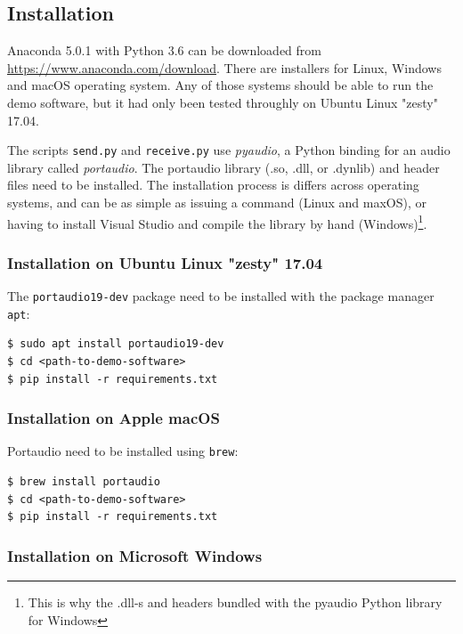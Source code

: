 \documentclass[a4paper]{article}
\begin{document}
\subsection{Installation}

Anaconda 5.0.1 with Python 3.6 can be downloaded from 
\url{https://www.anaconda.com/download}. There are installers for 
Linux, Windows and macOS operating system. Any of those systems should 
be able to run the demo software, but it had only been tested throughly 
on Ubuntu Linux "zesty" 17.04.

The scripts \texttt{send.py} and \texttt{receive.py} use 
\textit{pyaudio}, a Python binding for an audio library called 
\textit{portaudio}. The portaudio library (.so, .dll, or .dynlib) and 
header files need to be installed. The installation process is differs 
across operating systems, and can be as simple as issuing a command 
(Linux and maxOS), or having to install Visual Studio and compile the 
library by hand (Windows)\footnote{This is why the .dll-s and headers 
bundled with the pyaudio Python library for Windows}.

\subsubsection{Installation on Ubuntu Linux "zesty" 17.04}

The \texttt{portaudio19-dev} package need to be installed with the 
package manager \texttt{apt}:

\begin{lstlisting}
$ sudo apt install portaudio19-dev
$ cd <path-to-demo-software>
$ pip install -r requirements.txt
\end{lstlisting}

\subsubsection{Installation on Apple macOS}

Portaudio need to be installed using \texttt{brew}:

\begin{lstlisting}
$ brew install portaudio
$ cd <path-to-demo-software>
$ pip install -r requirements.txt
\end{lstlisting}

\subsubsection{Installation on Microsoft Windows}
\end{document}
